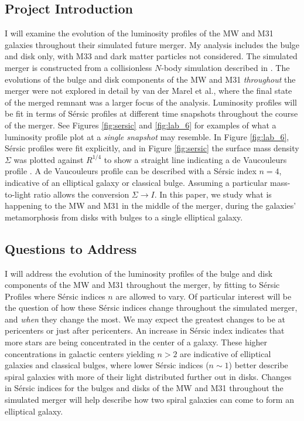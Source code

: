 \documentclass[twocolumn]{aastex631}
\begin{document}
\subsection{Project Introduction}
I will examine the evolution of the luminosity profiles of the MW and M31 galaxies throughout their simulated future merger. My analysis includes the bulge and disk only, with M33 and dark matter particles not considered. The simulated merger is constructed from a collisionless $N$-body simulation described in \cite{paper3}. The evolutions of the bulge and disk components of the MW and M31 \emph{throughout} the merger were not explored in detail by van der Marel et al., where the final state of the merged remnant was a larger focus of the analysis. Luminosity profiles will be fit in terms of S\'ersic profiles at different time snapshots throughout the course of the merger. See Figures \ref{fig:sersic} and \ref{fig:lab_6} for examples of what a luminosity profile plot at a \emph{single snapshot} may resemble. In Figure \ref{fig:lab_6}, S\'{e}rsic profiles were fit explicitly, and in Figure \ref{fig:sersic} the surface mass density $\Sigma$ was plotted against $R^{1/4}$ to show a straight line indicating a de Vaucouleurs profile \citep{deVaucouleurs1948}. A de Vaucouleurs profile can be described with a S\'{e}rsic index $n = 4$, indicative of an elliptical galaxy or classical bulge. Assuming a particular mass-to-light ratio allows the conversion $\Sigma \to I$. In this paper, we study what is happening to the MW and M31 in the middle of the merger, during the galaxies' metamorphosis from disks with bulges to a single elliptical galaxy.

\subsection{Questions to Address}
I will address the evolution of the luminosity profiles of the bulge and disk components of the MW and M31 throughout the merger, by fitting to S\'{e}rsic Profiles where S\'ersic indices $n$ are allowed to vary. Of particular interest will be the question of how these S\'{e}rsic indices change throughout the simulated merger, and \emph{when} they change the most. We may expect the greatest changes to be at pericenters or just after pericenters. An increase in S\'{e}rsic index indicates that more stars are being concentrated in the center of a galaxy. These higher concentrations in galactic centers yielding $n > 2$ are indicative of elliptical galaxies and classical bulges, where lower S\'{e}rsic indices ($n \sim 1$) better describe spiral galaxies with more of their light distributed further out in disks. Changes in S\'{e}rsic indices for the bulges and disks of the MW and M31 throughout the simulated merger will help describe how two spiral galaxies can come to form an elliptical galaxy.
\end{document}
